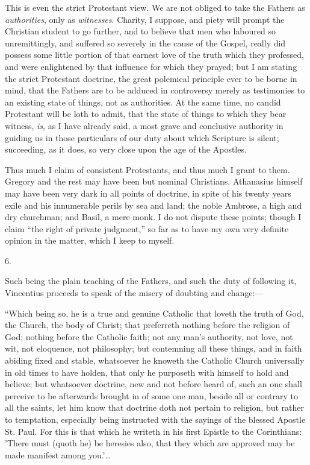 This is even the strict Protestant view. We are not obliged to take
the Fathers as \emph{authorities}, only as \emph{witnesses}. Charity,
I suppose, and piety will prompt the Christian student to go further,
and to believe that men who laboured so unremittingly, and suffered so
severely in the cause of the Gospel, really did possess some little
portion of that earnest love of the truth which they professed, and
were enlightened by that influence for which they prayed; but I am
stating the strict Protestant doctrine, the great polemical principle
ever to be borne in mind, that the Fathers are to be adduced in
controversy merely as testimonies to an existing state of things, not
as authorities. At the same time, no candid Protestant will be loth to
admit, that the state of things to which they bear witness, \emph{is},
as I have already said, a most grave and conclusive authority in
guiding us in those particulars of our duty about which Scripture is
silent; succeeding, as it does, so very close upon the age of the
Apostles.

Thus much I claim of consistent Protestants, and thus much I grant
to them. Gregory and the rest may have been but nominal Christians.
Athanasius himself may have been very dark in all points of doctrine,
in spite of his twenty years exile and his innumerable perils by sea
and land; the noble Ambrose, a high and dry churchman; and Basil, a
mere monk. I do not dispute these points; though I claim ``the
right of private judgment,'' so far as to have my own very
definite opinion in the matter, which I keep to myself.

6.

Such being the plain teaching of the Fathers, and such the duty of
following it, Vincentius proceeds to speak of the misery of doubting
and change:—

``Which being so, he is a true and genuine Catholic that loveth
the truth of God, the Church, the body of Christ; that preferreth
nothing before the religion of God; nothing before the Catholic faith;
not any man's authority, not love, not wit, not eloquence, not
philosophy; but contemning all these things, and in faith abiding
fixed and stable, whatsoever he knoweth the Catholic Church
universally in old times to have holden, that only he purposeth with
himself to hold and believe; but whatsoever doctrine, new and not
before heard of, such an one shall perceive to be afterwards brought
in of some one man, beside all or contrary to all the saints, let him
know that doctrine doth not pertain to religion, but rather to
temptation, especially being instructed with the sayings of the
blessed Apostle St. Paul. For this is that which he writeth in his
first Epistle to the Corinthians: 'There must (quoth he) be heresies
also, that they which are approved may be made manifest among you.'…

